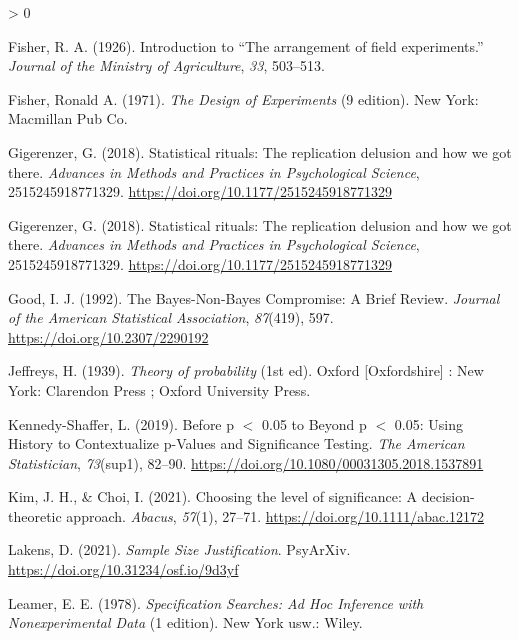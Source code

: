 \documentclass[
  english,
  ,man, a4paper,floatsintext]{apa6}
\newlength{\cslhangindent}
\newenvironment{CSLReferences}[2] %
 {%
  \setlength{\parindent}{0pt}
  \ifodd #1 \everypar{\setlength{\hangindent}{\cslhangindent}}\ignorespaces\fi
  \ifnum #2 > 0
  \setlength{\parskip}{#2\baselineskip}
  \fi
 }%
 {}
\begin{document}
\begin{CSLReferences}{1}{0}
\leavevmode\hypertarget{ref-fisher_introduction_1926}{}%
Fisher, R. A. (1926). Introduction to {``{The} arrangement of field experiments.''} \emph{Journal of the Ministry of Agriculture}, \emph{33}, 503--513.

\leavevmode\hypertarget{ref-fisher_design_1971}{}%
Fisher, Ronald A. (1971). \emph{The {Design} of {Experiments}} (9 edition). New York: Macmillan Pub Co.

\leavevmode\hypertarget{ref-gigerenzer_statistical_2018}{}%
Gigerenzer, G. (2018). Statistical rituals: The replication delusion and how we got there. \emph{Advances in Methods and Practices in Psychological Science}, 2515245918771329. \url{https://doi.org/10.1177/2515245918771329}

\leavevmode\hypertarget{ref-gigerenzer_statistical_2018}{}%
Gigerenzer, G. (2018). Statistical rituals: The replication delusion and how we got there. \emph{Advances in Methods and Practices in Psychological Science}, 2515245918771329. \url{https://doi.org/10.1177/2515245918771329}

\leavevmode\hypertarget{ref-good_bayes-non-bayes_1992}{}%
Good, I. J. (1992). The {Bayes}-{Non}-{Bayes Compromise}: {A Brief Review}. \emph{Journal of the American Statistical Association}, \emph{87}(419), 597. \url{https://doi.org/10.2307/2290192}

\leavevmode\hypertarget{ref-jeffreys_theory_1939}{}%
Jeffreys, H. (1939). \emph{Theory of probability} (1st ed). {Oxford {[}Oxfordshire{]} : New York}: {Clarendon Press ; Oxford University Press}.

\leavevmode\hypertarget{ref-kennedy-shaffer_before_2019}{}%
Kennedy-Shaffer, L. (2019). Before p {\(<\)} 0.05 to {Beyond} p {\(<\)} 0.05: {Using History} to {Contextualize} p-{Values} and {Significance Testing}. \emph{The American Statistician}, \emph{73}(sup1), 82--90. \url{https://doi.org/10.1080/00031305.2018.1537891}

\leavevmode\hypertarget{ref-kim2021choosing}{}%
Kim, J. H., \& Choi, I. (2021). Choosing the level of significance: A decision-theoretic approach. \emph{Abacus}, \emph{57}(1), 27--71. \url{https://doi.org/10.1111/abac.12172}

\leavevmode\hypertarget{ref-lakens_sample_2021}{}%
Lakens, D. (2021). \emph{Sample {Size} {Justification}}. PsyArXiv. \url{https://doi.org/10.31234/osf.io/9d3yf}

\leavevmode\hypertarget{ref-leamer_specification_1978}{}%
Leamer, E. E. (1978). \emph{Specification {Searches}: {Ad Hoc Inference} with {Nonexperimental Data}} (1 edition). {New York usw.}: {Wiley}.


\end{CSLReferences}
\end{document}
